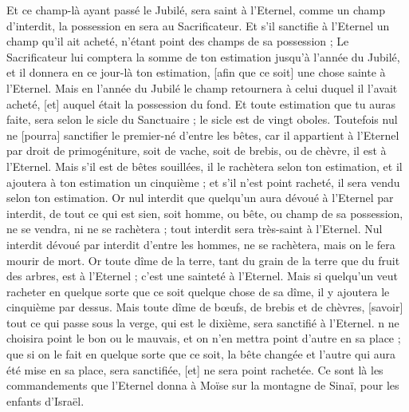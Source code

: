 \begin{multicols}{2}
Et ce champ-là ayant passé le Jubilé, sera saint à l'Eternel, comme un champ d'interdit, la possession en sera au Sacrificateur.
Et s'il sanctifie à l'Eternel un champ qu'il ait acheté, n'étant point des champs de sa possession ;
Le Sacrificateur lui comptera la somme de ton estimation jusqu'à l'année du Jubilé, et il donnera en ce jour-là ton estimation, [afin que ce soit] une chose sainte à l'Eternel.
Mais en l'année du Jubilé le champ retournera à celui duquel il l'avait acheté, [et] auquel était la possession du fond.
Et toute estimation que tu auras faite, sera selon le sicle du Sanctuaire ; le sicle est de vingt oboles.
Toutefois nul ne [pourra] sanctifier le premier-né d'entre les bêtes, car il appartient à l'Eternel par droit de primogéniture, soit de vache, soit de brebis, ou de chèvre, il est à l'Eternel.
Mais s'il est de bêtes souillées, il le rachètera selon ton estimation, et il ajoutera à ton estimation un cinquième ; et s'il n'est point racheté, il sera vendu selon ton estimation.
Or nul interdit que quelqu'un aura dévoué à l'Eternel par interdit, de tout ce qui est sien, soit homme, ou bête, ou champ de sa possession, ne se vendra, ni ne se rachètera ; tout interdit sera très-saint à l'Eternel.
Nul interdit dévoué par interdit d'entre les hommes, ne se rachètera, mais on le fera mourir de mort.
Or toute dîme de la terre, tant du grain de la terre que du fruit des arbres, est à l'Eternel ; c'est une sainteté à l'Eternel.
Mais si quelqu'un veut racheter en quelque sorte que ce soit quelque chose de sa dîme, il y ajoutera le cinquième par dessus.
Mais toute dîme de bœufs, de brebis et de chèvres, [savoir] tout ce qui passe sous la verge, qui est le dixième, sera sanctifié à l'Eternel.
n ne choisira point le bon ou le mauvais, et on n'en mettra point d'autre en sa place ; que si on le fait en quelque sorte que ce soit, la bête changée et l'autre qui aura été mise en sa place, sera sanctifiée, [et] ne sera point rachetée.
Ce sont là les commandements que l'Eternel donna à Moïse sur la montagne de Sinaï, pour les enfants d'Israël.
\PPE{}
\end{multicols}
